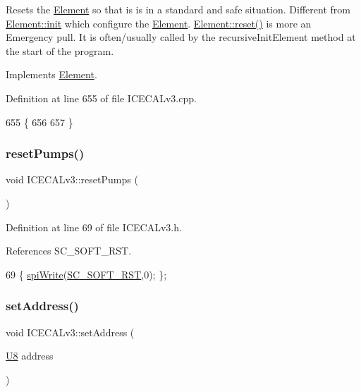 Resets the \hyperlink{classElement}{Element} so that is is in a standard and safe situation. Different from \hyperlink{classElement_af42754b5cabc198869222725218d695c}{Element\+::init} which configure the \hyperlink{classElement}{Element}. \hyperlink{classElement_a69efffa22f06909d768149715565cb56}{Element\+::reset()} is more an Emergency pull. It is often/usually called by the recursive\+Init\+Element method at the start of the program. 

Implements \hyperlink{classElement_a69efffa22f06909d768149715565cb56}{Element}.



Definition at line 655 of file I\+C\+E\+C\+A\+Lv3.\+cpp.


\begin{DoxyCode}
655                     \{
656 
657 \}
\end{DoxyCode}
\mbox{\label{classICECALv3_a1b9ca0e09d45634a70da6f19a7257314}} 
\subsubsection{\texorpdfstring{reset\+Pumps()}{resetPumps()}}
{\footnotesize\ttfamily void I\+C\+E\+C\+A\+Lv3\+::reset\+Pumps (\begin{DoxyParamCaption}{ }\end{DoxyParamCaption})\hspace{0.3cm}{\ttfamily [inline]}}



Definition at line 69 of file I\+C\+E\+C\+A\+Lv3.\+h.



References S\+C\+\_\+\+S\+O\+F\+T\+\_\+\+R\+ST.


\begin{DoxyCode}
69 \{                                       \hyperlink{classICECALv3_aef00f02801dea4bda2093c930501dcdd}{spiWrite}(\hyperlink{ICECALv3_8h_adfc33152f992de37ef835a719df6c934}{SC\_SOFT\_RST},0);                                 
      \};
\end{DoxyCode}
\mbox{\label{classICECALv3_aaf38119f47401a85022ae1b0d05675bd}} 
\subsubsection{\texorpdfstring{set\+Address()}{setAddress()}}
{\footnotesize\ttfamily void I\+C\+E\+C\+A\+Lv3\+::set\+Address (\begin{DoxyParamCaption}\item[{\hyperlink{ICECALv3_8h_a3cb25ca6f51f003950f9625ff05536fc}{U8}}]{address }\end{DoxyParamCaption})\hspace{0.3cm}{\ttfamily [inline]}}



